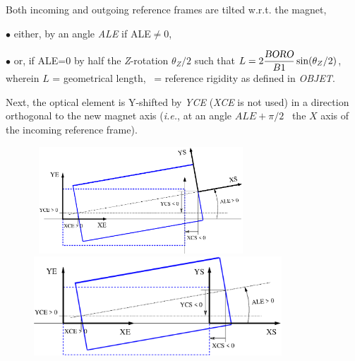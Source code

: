 \medskip
 
\noindent Both incoming and outgoing reference frames are  tilted w.r.t. the magnet,  

 $\bullet$ either,  by an angle \textsl{ALE}  if ALE$\not =$0, 

 $\bullet$ or, if ALE=0  by  half the \textsl{Z}-rotation $\theta_Z/2$ such that $ L = 
2 \dfrac{\textsl{BORO}}{B1} \sin({\theta_Z}/{2})$,  wherein $L$ = geometrical length, 
\BORO\  = reference rigidity as defined in \textsl{OBJET}.

\noindent Next, the optical element is  Y-shifted by \textsl{YCE} (\textsl{XCE} is not used) in a 
direction orthogonal to the new magnet axis (\emph{i.e.}, at an angle $ALE+\pi/2$ \wrt\ the $X$ axis of the incoming 
reference frame).



\begin{figure}[h]
\begin{center}

\mbox{
\includegraphics[height=4cm]{Fig34A.eps} \hspace{.02\linewidth}
\includegraphics[height=3.7cm]{Fig34.eps}
}
{\setlength{\captionwidth}{16cm}
}
\end{center}
\end{figure}


